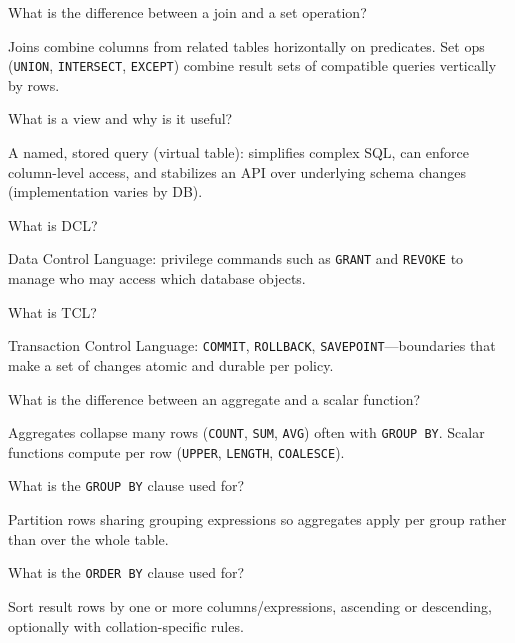 \question[4]
What is the difference between a join and a set operation?
\begin{solutionorbox}[1.25in]
  Joins combine columns from related tables horizontally on predicates. Set ops (\texttt{UNION}, \texttt{INTERSECT}, \texttt{EXCEPT}) combine result sets of compatible queries vertically by rows.
\end{solutionorbox}

\question[4]
What is a view and why is it useful?
\begin{solutionorbox}[1.25in]
  A named, stored query (virtual table): simplifies complex SQL, can enforce column-level access, and stabilizes an API over underlying schema changes (implementation varies by DB).
\end{solutionorbox}

\newpage


\question[4]
What is DCL?
\begin{solutionorbox}[1in]
  Data Control Language: privilege commands such as \texttt{GRANT} and \texttt{REVOKE} to manage who may access which database objects.
\end{solutionorbox}

\question[4]
What is TCL?
\begin{solutionorbox}[1.05in]
  Transaction Control Language: \texttt{COMMIT}, \texttt{ROLLBACK}, \texttt{SAVEPOINT}---boundaries that make a set of changes atomic and durable per policy.
\end{solutionorbox}

\question[4]
What is the difference between an aggregate and a scalar function?
\begin{solutionorbox}[1.2in]
  Aggregates collapse many rows (\texttt{COUNT}, \texttt{SUM}, \texttt{AVG}) often with \texttt{GROUP BY}. Scalar functions compute per row (\texttt{UPPER}, \texttt{LENGTH}, \texttt{COALESCE}).
\end{solutionorbox}

\question[4]
What is the \texttt{GROUP BY} clause used for?
\begin{solutionorbox}[1.05in]
  Partition rows sharing grouping expressions so aggregates apply per group rather than over the whole table.
\end{solutionorbox}

\question[4]
What is the \texttt{ORDER BY} clause used for?
\begin{solutionorbox}[1in]
  Sort result rows by one or more columns/expressions, ascending or descending, optionally with collation-specific rules.
\end{solutionorbox}

